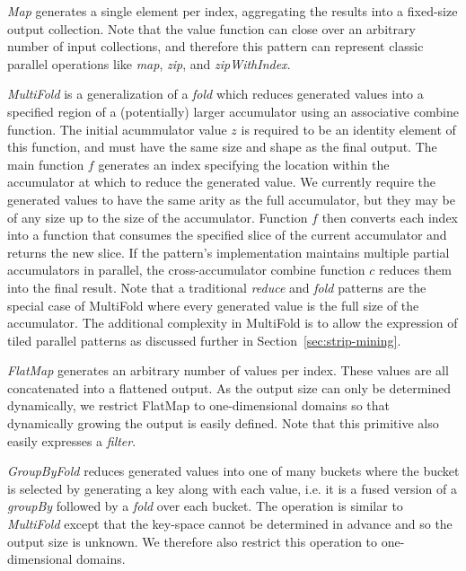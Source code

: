 \emph{Map} generates a single element per index, aggregating the results into a fixed-size output collection.
Note that the value function can close over an arbitrary number of input collections, and therefore this pattern can represent classic parallel operations like \emph{map}, \emph{zip},
and \emph{zipWithIndex}.

\emph{MultiFold} is a generalization of a \emph{fold} which reduces generated values into a specified region of a (potentially) larger accumulator using an associative combine function.
The initial acummulator value $z$ is required to be an identity element of this function, and must have the same size and shape as the final output.
The main function $f$ generates an index specifying the location within the accumulator at which to reduce the generated value. We currently require the generated values to have the same arity as the full accumulator, but they may be of any size up to the size of the accumulator.
Function $f$ then converts each index into a function that consumes the specified
slice of the current accumulator and returns the new slice. If the pattern's
implementation maintains multiple partial accumulators in parallel, the
cross-accumulator combine function $c$ reduces them into the final result.
Note that a traditional \emph{reduce} and \emph{fold} patterns are the special
case of MultiFold where every generated value is the full size of the accumulator.
The additional complexity in MultiFold is to allow the expression of tiled
parallel patterns as discussed further in Section~\ref{sec:strip-mining}.

\emph{FlatMap} generates an arbitrary number of values per index.
These values are all concatenated into a flattened output.
As the output size can only be determined dynamically, we restrict FlatMap to
one-dimensional domains so that dynamically growing the output is easily defined.
Note that this primitive also easily expresses a \emph{filter}.

\emph{GroupByFold} reduces generated values into one of many buckets where the bucket is selected by generating a key along with each value, i.e. it is a fused version of a \emph{groupBy} followed by a \emph{fold} over each bucket.
The operation is similar to \emph{MultiFold} except that the key-space cannot be determined in advance and so the output size is unknown.
We therefore also restrict this operation to one-dimensional domains.

